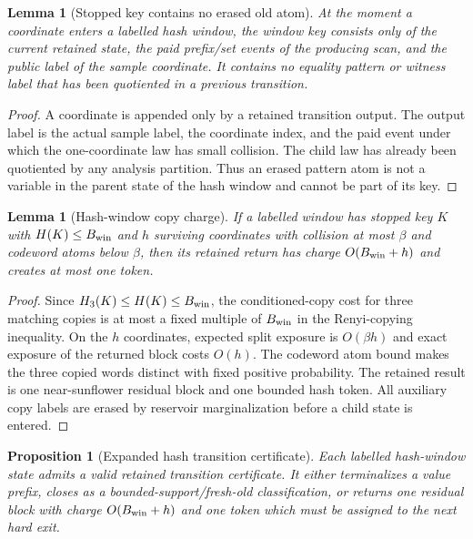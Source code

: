 \documentclass[11pt]{article}
\newtheorem{lemma}[theorem]{Lemma}
\newtheorem{proposition}[theorem]{Proposition}
\theoremstyle{remark}
\begin{document}
\begin{lemma}[Stopped key contains no erased old atom]\label{lem:app-hash-key-clean}
At the moment a coordinate enters a labelled hash window, the window key consists only of the current retained state, the paid prefix/set events of the producing scan, and the public label of the sample coordinate.  It contains no equality pattern or witness label that has been quotiented in a previous transition.
\end{lemma}

\begin{proof}
A coordinate is appended only by a retained transition output.  The output label is the actual sample label, the coordinate index, and the paid event under which the one-coordinate law has small collision.  The child law has already been quotiented by any analysis partition.  Thus an erased pattern atom is not a variable in the parent state of the hash window and cannot be part of its key.
\end{proof}

\begin{lemma}[Hash-window copy charge]\label{lem:app-hash-copy-charge}
If a labelled window has stopped key $K$ with $H(K)\le B_{\rm win}$ and $h$ surviving coordinates with collision at most $\beta$ and codeword atoms below $\beta$, then its retained return has charge $O(B_{\rm win}+h)$ and creates at most one token.
\end{lemma}

\begin{proof}
Since $H_3(K)\le H(K)\le B_{\rm win}$, the conditioned-copy cost for three matching copies is at most a fixed multiple of $B_{\rm win}$ in the Renyi-copying inequality.  On the $h$ coordinates, expected split exposure is $O(\beta h)$ and exact exposure of the returned block costs $O(h)$.  The codeword atom bound makes the three copied words distinct with fixed positive probability.  The retained result is one near-sunflower residual block and one bounded hash token.  All auxiliary copy labels are erased by reservoir marginalization before a child state is entered.
\end{proof}

\begin{proposition}[Expanded hash transition certificate]\label{prop:app-hash-certificate}
Each labelled hash-window state admits a valid retained transition certificate.  It either terminalizes a value prefix, closes as a bounded-support/fresh-old classification, or returns one residual block with charge $O(B_{\rm win}+h)$ and one token which must be assigned to the next hard exit.
\end{proposition}
\end{document}
